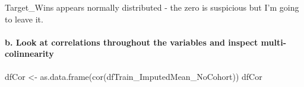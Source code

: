 \documentclass[
]{article}
\newenvironment{Shaded}{\begin{snugshade}}{\end{snugshade}}
\newcommand{\FunctionTok}[1]{\textcolor[rgb]{0.00,0.00,0.00}{#1}}
\newcommand{\NormalTok}[1]{#1}
\newcommand{\OtherTok}[1]{\textcolor[rgb]{0.56,0.35,0.01}{#1}}
\begin{document}
Target\_Wins appears normally distributed - the zero is suspicious but
I'm going to leave it.

\hypertarget{b.-look-at-correlations-throughout-the-variables-and-inspect-multi-colinnearity}{%
\paragraph{b. Look at correlations throughout the variables and inspect
multi-colinnearity}\label{b.-look-at-correlations-throughout-the-variables-and-inspect-multi-colinnearity}}

\begin{Shaded}
\begin{Highlighting}[]
\NormalTok{dfCor }\OtherTok{\textless{}{-}} \FunctionTok{as.data.frame}\NormalTok{(}\FunctionTok{cor}\NormalTok{(dfTrain\_ImputedMean\_NoCohort))}
\NormalTok{dfCor}
\end{Highlighting}
\end{Shaded}
\end{document}
